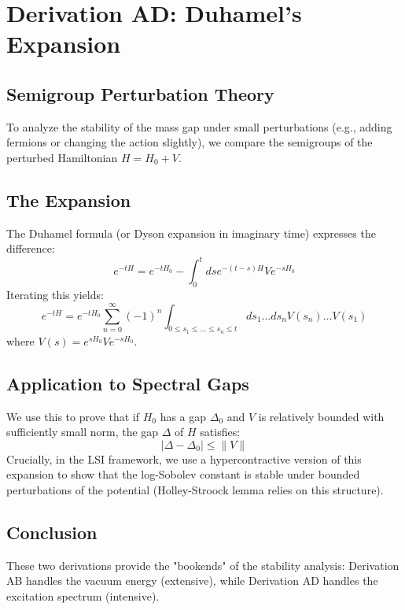 \chapter{Derivation AD: Duhamel's Expansion}
\label{ch:derivation_ad_duhamel}

\section{Semigroup Perturbation Theory}

To analyze the stability of the mass gap under small perturbations (e.g., adding fermions or changing the action slightly), we compare the semigroups of the perturbed Hamiltonian $H = H_0 + V$.

\section{The Expansion}

The Duhamel formula (or Dyson expansion in imaginary time) expresses the difference:
\begin{equation}
e^{-tH} = e^{-tH_0} - \int_0^t ds e^{-(t-s)H} V e^{-sH_0}
\end{equation}
Iterating this yields:
\begin{equation}
e^{-tH} = e^{-tH_0} \sum_{n=0}^\infty (-1)^n \int_{0 \le s_1 \le \dots \le s_n \le t} ds_1 \dots ds_n V(s_n) \dots V(s_1)
\end{equation}
where $V(s) = e^{sH_0} V e^{-sH_0}$.

\section{Application to Spectral Gaps}
We use this to prove that if $H_0$ has a gap $\Delta_0$ and $V$ is relatively bounded with sufficiently small norm, the gap $\Delta$ of $H$ satisfies:
\begin{equation}
|\Delta - \Delta_0| \le \|V\|
\end{equation}
Crucially, in the LSI framework, we use a hypercontractive version of this expansion to show that the log-Sobolev constant is stable under bounded perturbations of the potential (Holley-Stroock lemma relies on this structure).

\section{Conclusion}
These two derivations provide the "bookends" of the stability analysis: Derivation AB handles the vacuum energy (extensive), while Derivation AD handles the excitation spectrum (intensive).
